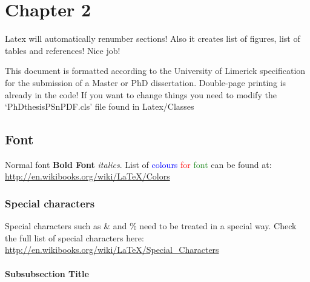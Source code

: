 

\chapter{Chapter 2} %


\ifpdf
    \graphicspath{{2_chapter2/figures/PNG/}{2_chapter2/figures/PDF/}{2_chapter2/figures/}}
\else
    \graphicspath{{2_chapter2/figures/EPS/}{2_chapter2/figures/}}
\fi


Latex will automatically renumber sections! Also it creates list of figures, list of tables and references! Nice job!


This document is formatted according to the University of Limerick specification for the submission of a Master or PhD dissertation.
Double-page printing is already in the code!
If you want to change things  you need to modify the `PhDthesisPSnPDF.cls' file found in Latex/Classes 




\section{Font}

Normal font \textbf{Bold Font} \emph{italics}.  List of \textcolor{blue}{colours} \textcolor{red}{for} \textcolor{ForestGreen}{font} can be found at: \url{http://en.wikibooks.org/wiki/LaTeX/Colors}

\subsection{Special characters}

Special characters such as \& and \% need to be treated in a special way. Check the full list of special characters here: \url{http://en.wikibooks.org/wiki/LaTeX/Special_Characters}
\subsubsection{Subsubsection Title}

